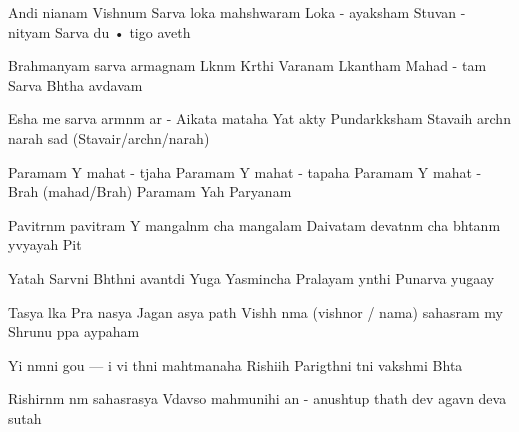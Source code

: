 \documentclass[20pt]{article}
\begin{document}
\SlokaHuge
{An{\aaa}di ni{\dhh}anam Vishnum} {Sarva loka mah{\e}shwaram}
{Loka - a{\dhh}yaksham Stuvan - nityam} {Sarva du {•} {\A}tigo {\bh}aveth}

\SlokaHuge
{Brahmanyam sarva {\Dh}armagnam} {L{\oh}k{\A}n{\A}m K{\ee}rthi Var{\dhh}anam}
{L{\oh}kan{\A}tham Mahad - {\bh} {\oo}tam} {Sarva Bh{\oo}tha {\bh}av{\oh}d{\bh}avam}

\SlokaHuge
{Esha me sarva {\Dh}arm{\A}n{\A}m} {{\Dh}ar{\mo} - A{\dhh}ikata{\mo} mataha}
{Yat \dsh {\bh}akty{\A} Pundar{\ee}k{\A}ksham} {Stavaih arch{\e}n narah sad{\A} (Stavair/arch{\e}n/narah)}

\novspace
\SlokaHuge
{Paramam Y{\oh} mahat - t{\e}jaha} {Paramam Y{\oh} mahat - tapaha}
{Paramam Y{\oh} mahat - Brah{\ma} (mahad/Brah{\ma})} {Paramam Yah Par{\A}yanam}

\SlokaHuge
{Pavitr{\A}n{\A}m pavitram Y{\oh}} {mangal{\A}n{\A}m cha mangalam}
{Daivatam devat{\A}n{\A}m cha} {bh{\oo}tan{\A}m y{\oh}vyayah Pit{\A}}

\SlokaHuge
{Yatah Sarv{\A}ni Bh{\oo}th{\A}ni} {{\Bh}avant{\ya}di Yu{\ga}ga{\me}}
{Yasmin{\sh}cha Pralayam y{\A}nthi} {Punar{\e}va yuga{\ksh}ay{\e}}

\SlokaHuge
{Tasya l{\oh}ka Pra{\dhh} {\A}nasya} {Jagan{\na} {\Th}asya {\Bh} {\oo}path{\e}}
{Vish{\no}h \dsh n{\A}ma (vishnor / nama) sahasram m{\e}y} {Shrunu p{\A}pa {\Bh}ay{\A}paham}

\SlokaHuge
{Y{\an}i n{\A}m{\A}ni gou {---} {\N}i} {vi{\kh} {\ya}th{\A}ni mah{\A}tmanaha}
{Rishi{\bh}ih Parig{\ee}th{\A}ni} {t{\ha}ni vaksh{\ya}mi Bh{\oo}ta{\ye}}

\SlokaHuge
{Rishirn{\A}m n{\A}m sahasrasya} {V{\e}dav{\ya}so mah{\A}munihi}
{{\ch}an{\dO} - anushtup thath{\A} dev{\oh}} {{\Bh}agav{\A}n deva{\ki} sutah}


\end{document}
